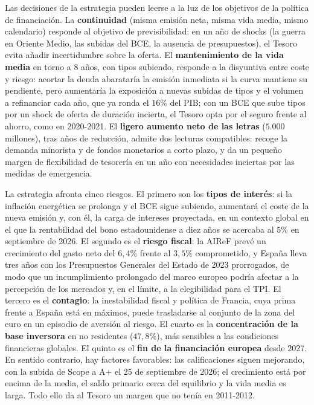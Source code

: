 \documentclass[10pt,a4paper]{article}
\begin{document}
Las decisiones de la estrategia pueden leerse a la luz de los objetivos de la política de financiación. La \textbf{continuidad} (misma emisión neta, misma vida media, mismo calendario) responde al objetivo de previsibilidad: en un año de shocks (la guerra en Oriente Medio, las subidas del BCE, la ausencia de presupuestos), el Tesoro evita añadir incertidumbre sobre la oferta. El \textbf{mantenimiento de la vida media} en torno a $8$ años, con tipos subiendo, responde a la disyuntiva entre coste y riesgo: acortar la deuda abarataría la emisión inmediata si la curva mantiene su pendiente, pero aumentaría la exposición a nuevas subidas de tipos y el volumen a refinanciar cada año, que ya ronda el $16\%$ del PIB; con un BCE que sube tipos por un shock de oferta de duración incierta, el Tesoro opta por el seguro frente al ahorro, como en 2020-2021. El \textbf{ligero aumento neto de las letras} ($5.000$ millones), tras años de reducción, admite dos lecturas compatibles: recoge la demanda minorista y de fondos monetarios a corto plazo, y da un pequeño margen de flexibilidad de tesorería en un año con necesidades inciertas por las medidas de emergencia.

La estrategia afronta cinco riesgos. El primero son los \textbf{tipos de interés}: si la inflación energética se prolonga y el BCE sigue subiendo, aumentará el coste de la nueva emisión y, con él, la carga de intereses proyectada, en un contexto global en el que la rentabilidad del bono estadounidense a diez años se acercaba al $5\%$ en septiembre de 2026. El segundo es el \textbf{riesgo fiscal}: la AIReF prevé un crecimiento del gasto neto del $6,4\%$ frente al $3,5\%$ comprometido, y España lleva tres años con los Presupuestos Generales del Estado de 2023 prorrogados, de modo que un incumplimiento prolongado del marco europeo podría afectar a la percepción de los mercados y, en el límite, a la elegibilidad para el TPI. El tercero es el \textbf{contagio}: la inestabilidad fiscal y política de Francia, cuya prima frente a España está en máximos, puede trasladarse al conjunto de la zona del euro en un episodio de aversión al riesgo. El cuarto es la \textbf{concentración de la base inversora} en no residentes ($47,8\%$), más sensibles a las condiciones financieras globales. El quinto es el \textbf{fin de la financiación europea} desde 2027. En sentido contrario, hay factores favorables: las calificaciones siguen mejorando, con la subida de Scope a A+ el 25 de septiembre de 2026; el crecimiento está por encima de la media, el saldo primario cerca del equilibrio y la vida media es larga. Todo ello da al Tesoro un margen que no tenía en 2011-2012.
\end{document}
